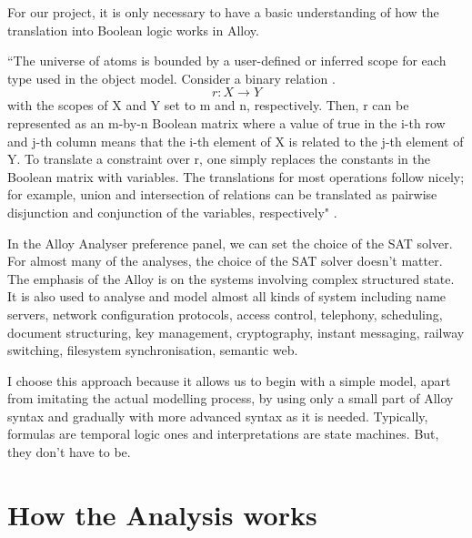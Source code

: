 \documentclass[a4paper,10pt]{report}
\begin{document}
For our project, it is only necessary to have a basic understanding of how the translation into Boolean logic works in Alloy. 
 
``The universe of atoms is bounded by a user-defined or inferred scope for each type used in the object model. Consider a binary relation .
\begin{equation}
r : X \rightarrow Y
\end{equation} with the scopes of X and Y set to m and n, respectively. Then, r can be represented as an m-by-n Boolean matrix where a value of true in the i-th row and j-th column means that the i-th element of X is related to the j-th element of Y. To translate a constraint over r, one simply replaces the constants in the Boolean matrix with variables. The translations for most operations follow nicely; for example, union and intersection of relations can be translated as pairwise disjunction and conjunction of the variables, respectively" \cite{Yeung2005}.

In the Alloy Analyser preference panel, we can set the choice of the SAT solver. For almost many of the analyses, the choice of the SAT solver doesn't matter. The emphasis of the Alloy is on the systems involving complex structured state. It is also used to analyse and model almost all kinds of system including name servers, network configuration protocols, access control, telephony, scheduling, document structuring, key management, cryptography, instant messaging, railway switching, filesystem synchronisation, semantic web. 

I choose this approach because it allows us to begin with a simple model, apart from imitating the actual modelling process, by using only a small part of Alloy syntax and gradually with more advanced syntax as it is needed. Typically, formulas are temporal logic ones and interpretations are state machines. But, they don't have to be.

\section{How the Analysis works}
\label{Working of analyses}
\end{document}
